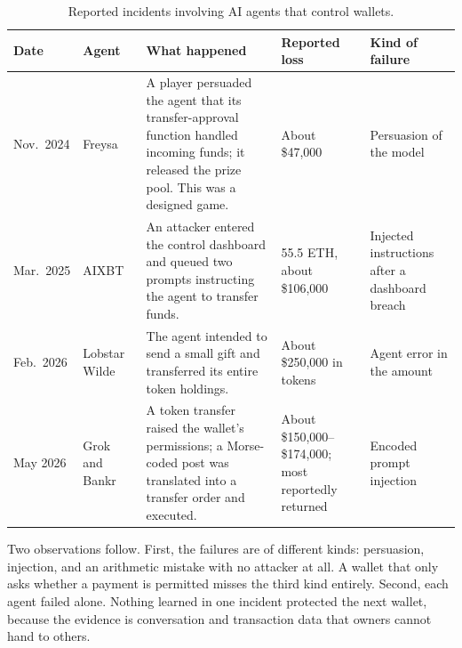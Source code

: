 \documentclass[10pt,a4paper,twocolumn]{article}
\newcommand{\tblfont}{\footnotesize}
\begin{document}
\begin{table}[t]
\caption{Reported incidents involving AI agents that control wallets.}
\label{tab:incidents}
\tblfont
\begin{tabularx}{\textwidth}{@{}P{0.09\textwidth} P{0.13\textwidth} L P{0.17\textwidth} P{0.19\textwidth}@{}}
\toprule
\textbf{Date} & \textbf{Agent} & \textbf{What happened} & \textbf{Reported loss} & \textbf{Kind of failure} \\
\midrule
Nov.\ 2024 & Freysa~\cite{freysa} & A player persuaded the agent that its transfer-approval function handled incoming funds; it released the prize pool. This was a designed game. & About \$47,000 & Persuasion of the model \\
Mar.\ 2025 & AIXBT~\cite{aixbt} & An attacker entered the control dashboard and queued two prompts instructing the agent to transfer funds. & 55.5 ETH, about \$106,000 & Injected instructions after a dashboard breach \\
Feb.\ 2026 & Lobstar Wilde~\cite{lobstar} & The agent intended to send a small gift and transferred its entire token holdings. & About \$250,000 in tokens & Agent error in the amount \\
May 2026 & Grok and Bankr~\cite{oecdgrok,giskard} & A token transfer raised the wallet's permissions; a Morse-coded post was translated into a transfer order and executed. & About \$150,000--\$174,000; most reportedly returned & Encoded prompt injection \\
\bottomrule
\end{tabularx}
\end{table}

Two observations follow. First, the failures are of different kinds: persuasion,
injection, and an arithmetic mistake with no attacker at all. A wallet that only asks
whether a payment is permitted misses the third kind entirely. Second, each agent failed
alone. Nothing learned in one incident protected the next wallet, because the evidence is
conversation and transaction data that owners cannot hand to others.
\end{document}
